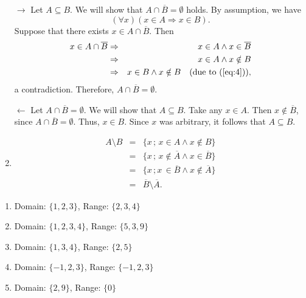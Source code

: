\begin{answer}{2.21}
    \begin{enumerate}
\item[$\rightarrow$]
Let $A\subseteq B$.
We will show that $A\cap \overline{B} = \emptyset$ holds. By assumption, we have
\begin{equation}\label{eq:4}
(\forall x)(x\in A \Rightarrow x\in B).
\end{equation}
Suppose that there exists $x\in A\cap \overline{B}$. Then
\begin{eqnarray*}
x\in A\cap \overline{B} &\Rightarrow & x\in A \wedge x\in \overline{B}\\
						&\Rightarrow & x\in A \wedge x \notin B\\
						&\Rightarrow & x\in B \wedge x \notin B \quad (\textrm{due to } (\ref{eq:4})),
\end{eqnarray*}
a contradiction. Therefore, $A\cap \overline{B}=\emptyset$.

$\leftarrow$ Let $A\cap \overline{B}=\emptyset$. We will show that $A\subseteq B$. Take any $x\in A$. Then $x\notin \overline{B}$, since $A\cap \overline{B}=\emptyset$. Thus, $x\in B$. Since $x$ was arbitrary, it follows that $A\subseteq B$.

\item
\begin{eqnarray*}
A\setminus B & = & \{x\, ;\, x\in A \wedge x\notin B \}\\
             & = & \{x\, ;\, x\notin \overline{A} \wedge x  \in \overline{B} \}\\
             & = & \{x\, ; x\,  \in \overline{B} \wedge  x\notin \overline{A} \}\\
             & = & \overline{B} \setminus \overline{A}.
\end{eqnarray*}

\end{enumerate}


\end{answer}
\begin{answer}{3.4}
    \begin{enumerate}
    \item Domain: \(\{1, 2, 3\}\), Range: \(\{2, 3, 4\}\)
    \item Domain: \(\{1, 2, 3, 4\}\), Range: \(\{5, 3, 9\}\)
    \item Domain: \(\{1, 3, 4\}\), Range: \(\{2, 5\}\)
    \item Domain: \(\{-1, 2, 3\}\), Range: \(\{-1, 2, 3\}\)
    \item Domain: \(\{2, 9\}\), Range: \(\{0\}\)
\end{enumerate}

\end{answer}
